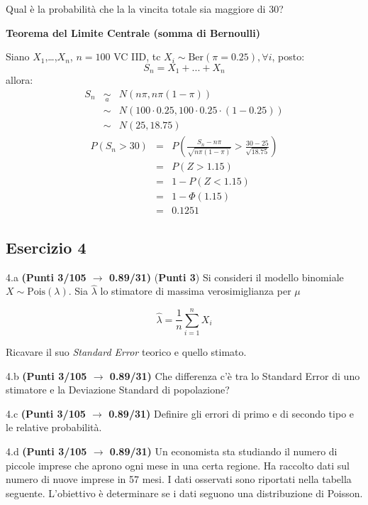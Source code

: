 \documentclass[
  11pt,
]{book}
\theoremstyle{mytheoremstyle}
\theoremstyle{mydefstyle}
\newenvironment{sol}
  {
  \begin{tcolorbox}[enhanced,breakable,arc=0.1mm,boxrule=1pt,colback=white,colframe=iblue,
  title=\bf \fontfamily{lmss}\selectfont \hspace{.5 cm} Soluzione,drop fuzzy shadow]

}{
\end{tcolorbox}
  }
\begin{document}
Qual è la probabilità che la la vincita totale sia maggiore di 30?

\begin{sol}
\textbf{Teorema del Limite Centrale (somma di Bernoulli)}

Siano \(X_1\),\ldots,\(X_n\), \(n=100\) VC IID, tc \(X_i\sim\text{Ber}(\pi=0.25)\)\(,\forall i\), posto:
\[
      S_n = X_1 + ... + X_n
      \]
allora:\begin{eqnarray*}
  S_n & \mathop{\sim}\limits_{a}& N(n\pi,n\pi(1-\pi)) \\
      &\sim & N(100\cdot0.25,100\cdot0.25\cdot(1-0.25)) \\
      &\sim & N(25,18.75)
  \end{eqnarray*}\begin{eqnarray*}
      P( S_n   >   30 ) 
        &=& P\left(  \frac { S_n  -  n\pi }{ \sqrt{n\pi(1-\pi)} }  >  \frac { 30  -  25 }{\sqrt{ 18.75 }} \right)  \\
                 &=& P\left(  Z   >   1.15 \right) \\    &=& 1-P(Z< 1.15 )\\ 
                 &=&  1-\Phi( 1.15 ) \\ &=&  0.1251 
      \end{eqnarray*}

\end{sol}

\subsection{Esercizio 4}\label{esercizio-4-39}

4.a \textbf{(Punti 3/105 \(\rightarrow\) 0.89/31)} (\textbf{Punti 3}) Si consideri il modello binomiale \(X\sim\text{Pois}(\lambda)\). Sia \(\hat\lambda\) lo stimatore di massima verosimiglianza per \(\mu\)

\[
  \hat\lambda = \frac 1n \sum_{i=1}^n X_i
\]

Ricavare il suo \emph{Standard Error} teorico e quello stimato.

4.b \textbf{(Punti 3/105 \(\rightarrow\) 0.89/31)} Che differenza c'è tra lo Standard Error di uno stimatore e la Deviazione Standard di popolazione?

4.c \textbf{(Punti 3/105 \(\rightarrow\) 0.89/31)} Definire gli errori di primo e di secondo tipo e le relative probabilità.

4.d \textbf{(Punti 3/105 \(\rightarrow\) 0.89/31)} Un economista sta studiando il numero di piccole imprese che aprono ogni mese in una certa regione. Ha raccolto dati sul numero di nuove imprese in 57 mesi. I dati osservati sono riportati nella tabella seguente. L'obiettivo è determinare se i dati seguono una distribuzione di Poisson.
\end{document}
